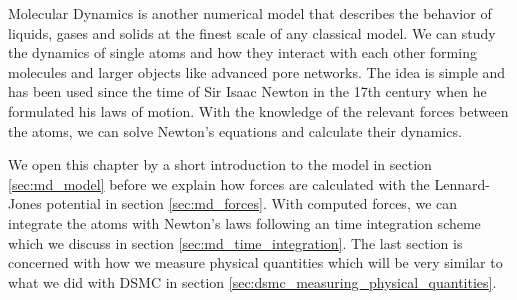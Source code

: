 Molecular Dynamics is another numerical model that describes the behavior of liquids, gases and solids at the finest scale of any classical model. We can study the dynamics of single atoms and how they interact with each other forming molecules and larger objects like advanced pore networks. The idea is simple and has been used since the time of Sir Isaac Newton in the 17th century when he formulated his laws of motion. With the knowledge of the relevant forces between the atoms, we can solve Newton's equations and calculate their dynamics.

We open this chapter by a short introduction to the model in section \ref{sec:md_model} before we explain how forces are calculated with the Lennard-Jones potential in section \ref{sec:md_forces}. With computed forces, we can integrate the atoms with Newton's laws following an time integration scheme which we discuss in section \ref{sec:md_time_integration}. The last section is concerned with how we measure physical quantities which will be very similar to what we did with DSMC in section \ref{sec:dsmc_measuring_physical_quantities}.